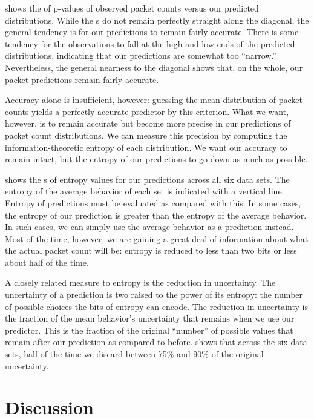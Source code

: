 \documentclass[conference]{IEEEtran}
\begin{document}
 shows the  of p-values of observed packet counts versus our predicted distributions.
While the s do not remain perfectly straight along the diagonal, the general tendency is for our predictions to remain fairly accurate.
There is some tendency for the observations to fall at the high and low ends of the predicted distributions, indicating that our predictions are somewhat too ``narrow.''
Nevertheless, the general nearness to the diagonal shows that, on the whole, our packet predictions remain fairly accurate.

Accuracy alone is insufficient, however:
guessing the mean distribution of packet counts yields a perfectly accurate predictor by this criterion.
What we want, however, is to remain accurate but become more precise in our predictions of packet count distributions.
We can measure this precision by computing the information-theoretic entropy of each distribution.
We want our accuracy to remain intact, but the entropy of our predictions to go down as much as possible.

 shows the s of entropy values for our predictions across all six data sets.
The entropy of the average behavior of each set is indicated with a vertical line.
Entropy of predictions must be evaluated as compared with this.
In some cases, the entropy of our prediction is greater than the entropy of the average behavior.
In such cases, we can simply use the average behavior as a prediction instead.
Most of the time, however, we are gaining a great deal of information about what the actual packet count will be:
entropy is reduced to less than two bits or less about half of the time.

A closely related measure to entropy is the reduction in uncertainty.
The uncertainty of a prediction is two raised to the power of its entropy:
the number of possible choices the bits of entropy can encode.
The reduction in uncertainty is the fraction of the mean behavior's uncertainty that remains when we use our predictor.
This is the fraction of the original ``number'' of possible values that remain after our prediction as compared to before.
 shows that across the six data sets, half of the time we discard between 75\% and 90\% of the original uncertainty.

\section{Discussion}
\end{document}

